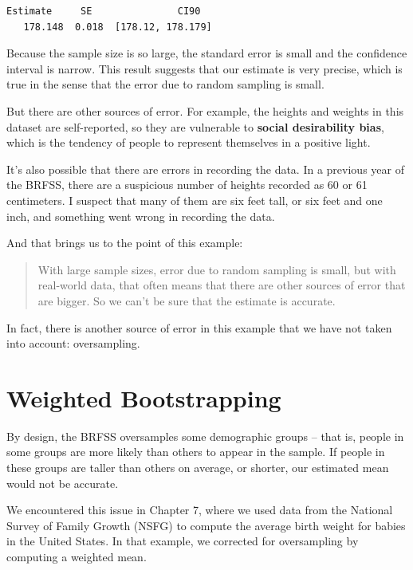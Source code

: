 \begin{lstlisting}[style=output]
  Estimate     SE               CI90
   178.148  0.018  [178.12, 178.179]
\end{lstlisting}

Because the sample size is so large, the standard error is small and the
confidence interval is narrow. This result suggests that our estimate is
very precise, which is true in the sense that the error due to random
sampling is small.

But there are other sources of error. For example, the heights and
weights in this dataset are self-reported, so they are vulnerable to
\textbf{social desirability bias}, which is the tendency of people to
represent themselves in a positive light.

It's also possible that there are errors in recording the data. In a
previous year of the BRFSS, there are a suspicious number of heights
recorded as 60 or 61 centimeters. I suspect that many of them are six
feet tall, or six feet and one inch, and something went wrong in
recording the data.

And that brings us to the point of this example:

\begin{quote}
With large sample sizes, error due to random sampling is small, but with
real-world data, that often means that there are other sources of error
that are bigger. So we can't be sure that the estimate is accurate.
\end{quote}

In fact, there is another source of error in this example that we have
not taken into account: oversampling.

\hypertarget{weighted-bootstrapping}{%
\section{Weighted Bootstrapping}\label{weighted-bootstrapping}}

By design, the BRFSS oversamples some demographic groups -- that is,
people in some groups are more likely than others to appear in the
sample. If people in these groups are taller than others on average, or
shorter, our estimated mean would not be accurate.

We encountered this issue in Chapter 7, where we used data from the
National Survey of Family Growth (NSFG) to compute the average birth
weight for babies in the United States. In that example, we corrected
for oversampling by computing a weighted mean.


